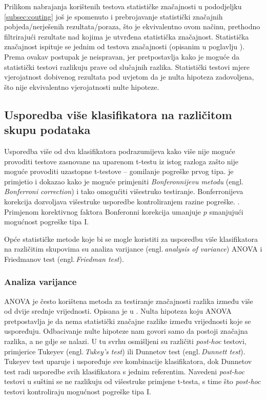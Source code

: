 Prilikom nabrajanja korištenih testova statističke značajnosti u pododjeljku \ref{subsec:couting} još je spomenuto i prebrojavanje statistički značajnih pobjeda/nerješenih rezultata/poraza, što je ekvivalentno ovom načinu, prethodno filtrirajući rezultate nad kojima je utvrđena statistička značajnost. Statistička značajnost ispituje se jednim od testova značajnosti (opisanim u poglavlju %
). Prema \citep{demvsar2006statistical} ovakav postupak je neispravan, jer pretpostavlja kako je moguće da statistički testovi razlikuju prave od slučajnih razlika. Statistički testovi mjere vjerojatnost dobivenog rezultata pod uvjetom da je nulta hipoteza zadovoljena, što nije ekvivalentno vjerojatnosti nulte hipoteze.

\subsection{Usporedba više klasifikatora na različitom skupu podataka}

Usporedba više od dva klasifikatora podrazumijeva kako više nije moguće provoditi testove zasnovane na uparenom t-testu iz istog razloga zašto nije moguće provoditi uzastopne t-testove -- gomilanje pogreške prvog tipa. \citep{salzberg1997comparing} je primjetio i dokazao kako je moguće primjeniti \textit{Bonferonnijevu metodu} (engl.\,\textit{Bonferroni correction}) i tako omogućiti višestruko testiranje. Bonferronijeva korekcija dozvoljava višestruke usporedbe kontroliranjem razine pogreške. \citep{bland1995multiple}. Primjenom korektivnog faktora Bonferonni korekcija umanjuje $p$ smanjujući mogućnost pogreške tipa I.

Opće statističke metode koje bi se mogle koristiti za usporedbu više klasifikatora na različitim skupovima su analiza varijance (engl.\,\textit{analysis of variance}) ANOVA i Friedmanov test (engl.\,\textit{Friedman test}). 

\subsubsection{Analiza varijance}


ANOVA je često korištena metoda za testiranje značajnosti razlika između više od dvije srednje vrijednosti. Opisana je u \citep{fisher1956statistical}. Nulta hipoteza koju ANOVA pretpostavlja je da nema statistički značajne razlike između vrijednosti koje se uspoređuju. Odbacivanje nulte hipoteze nam govori samo da postoji značajna razlika, a ne gdje se nalazi. U tu svrhu osmišljeni su različiti \textit{post-hoc} testovi, primjerice Tukeyev (engl.\,\textit{Tukey's test}) ili Dunnetov test (engl.\,\textit{Dunnett test})\citep{wallenstein1980some}. Tukeyev test uparuje i uspoređuje sve kombinacije klasifikatora, dok Dunnetov test radi usporedbe svih klasifikatora s jednim referentim. Navedeni \textit{post-hoc} testovi u suštini se ne razlikuju od višestruke primjene t-testa,  s time što \textit{post-hoc} testovi kontroliraju mogućnost pogreške tipa I.

